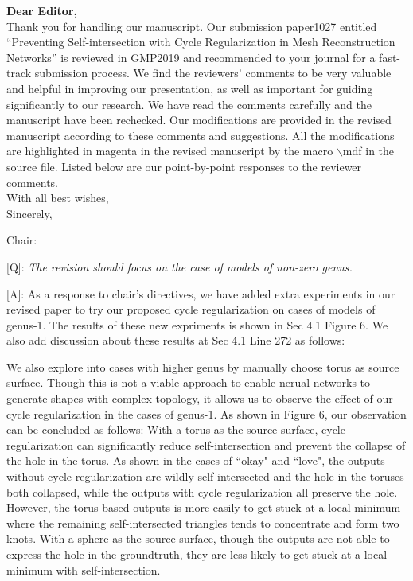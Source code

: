\documentclass[10pt]{letter} %
\newcommand{\mdf}[1]{\textcolor[rgb]{1.00,0.00,1.00}{#1}}
\begin{document}
	\textbf{Dear Editor,}\\
	Thank you for handling our manuscript. Our submission paper1027 entitled ``Preventing Self-intersection with Cycle Regularization in Mesh
	Reconstruction Networks'' is reviewed in GMP2019 and recommended to your journal for a fast-track submission process. We find the reviewers’ comments to be very valuable and helpful in improving our presentation, as well as important for guiding significantly to our research. We have read the comments carefully and the manuscript have been rechecked. Our modifications are provided in the revised manuscript according to these comments and suggestions. All the modifications are \mdf{highlighted in magenta} in the revised manuscript by the macro $\backslash$mdf in the source file. Listed below are our point-by-point responses to the reviewer comments.\\
	With all best wishes,\\
	Sincerely,
	
	\hdashrule{\linewidth}{1pt}{1mm}
	Chair:
	
	[Q]: \emph{The revision should focus on the case of models of non-zero genus.}
	
	[A]: As a response to chair's directives, we have added extra experiments in our revised paper to try our proposed cycle regularization on cases of models of genus-1. The results of these new expriments is shown in Sec 4.1 Figure 6. We also add discussion about these results at Sec 4.1 Line 272 as follows:
	 
	\mdf{We also explore into cases with higher genus by manually choose torus as source surface. Though this is not a viable approach to enable nerual networks to generate shapes with complex topology, it allows us to observe the effect of our cycle regularization in the cases of genus-1. As shown in Figure 6, our observation can be concluded as follows: With a torus as the source surface, cycle regularization can significantly reduce self-intersection and prevent the collapse of the hole in the torus. As shown in the cases of ``okay" and ``love", the outputs without cycle regularization are wildly self-intersected and the hole in the toruses both collapsed, while the outputs with cycle regularization all preserve the hole.  However, the torus based outputs is more easily to get stuck at a local minimum where the remaining self-intersected triangles tends to concentrate and form two knots. With a sphere as the source surface, though the outputs are not able to express the hole in the groundtruth, they are less likely to get stuck at a local minimum with self-intersection.  
	}
	
\end{document}
